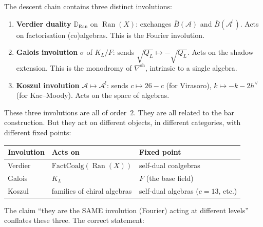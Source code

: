 \documentclass[11pt]{article}
\newcommand{\cA}{\mathcal{A}}
\newcommand{\B}{\bar{B}}
\newcommand{\bD}{\mathbb{D}}
\newcommand{\Ran}{\operatorname{Ran}}
\begin{document}
The descent chain contains three distinct involutions:
\begin{enumerate}[nosep]
\item \textbf{Verdier duality} $\bD_{\Ran}$ on $\Ran(X)$:
  exchanges $\B(\cA)$ and $\B(\cA^!)$.  Acts on factorisation
  (co)algebras.  This is the Fourier involution.
\item \textbf{Galois involution} $\sigma$ of $K_L/F$: sends
  $\sqrt{Q_L} \mapsto -\sqrt{Q_L}$.  Acts on the shadow
  extension.  This is the monodromy of $\nabla^{\mathrm{sh}}$,
  intrinsic to a single algebra.
\item \textbf{Koszul involution} $\cA \mapsto \cA^!$: sends
  $c \mapsto 26-c$ (for Virasoro), $k \mapsto -k - 2h^\vee$
  (for Kac--Moody).  Acts on the space of algebras.
\end{enumerate}

These three involutions are all of order~$2$.  They are all
related to the bar construction.  But they act on different
objects, in different categories, with different fixed points:
\begin{center}
\small
\begin{tabular}{@{}lll@{}}
\textbf{Involution} & \textbf{Acts on} & \textbf{Fixed point} \\
\hline
Verdier & $\mathrm{FactCoalg}(\Ran(X))$ & self-dual coalgebras \\
Galois & $K_L$ & $F$ (the base field) \\
Koszul & families of chiral algebras & self-dual algebras ($c=13$, etc.)
\end{tabular}
\end{center}

The claim ``they are the SAME involution (Fourier) acting at
different levels'' conflates these three.  The correct statement:
\end{document}
